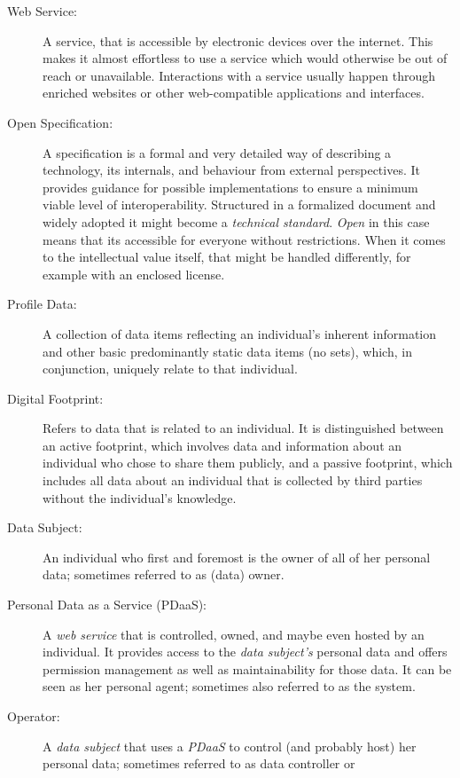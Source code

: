 \documentclass[12pt,english,a4paper,titlepage,cleardoublepage=empty,dottedtoc]{report}
\begin{document}
\begin{description}
\item[Web Service:]
A service, that is accessible by electronic devices over the internet.
This makes it almost effortless to use a service which would otherwise
be out of reach or unavailable. Interactions with a service usually
happen through enriched websites or other web-compatible applications
and interfaces.
\item[Open Specification:]
A specification is a formal and very detailed way of describing a
technology, its internals, and behaviour from external perspectives. It
provides guidance for possible implementations to ensure a minimum
viable level of interoperability. Structured in a formalized document
and widely adopted it might become a \emph{technical standard}.
\emph{Open} in this case means that its accessible for everyone without
restrictions. When it comes to the intellectual value itself, that might
be handled differently, for example with an enclosed license.
\item[\protect\hypertarget{terminologies--profile-data}{}{Profile
Data}:]
A collection of data items reflecting an individual's inherent
information and other basic predominantly static data items (no sets),
which, in conjunction, uniquely relate to that individual.
\item[\protect\hypertarget{terminologies--digital-footprint}{}{Digital
Footprint}:]
Refers to data that is related to an individual. It is distinguished
between an active footprint, which involves data and information about
an individual who chose to share them publicly, and a passive footprint,
which includes all data about an individual that is collected by third
parties without the individual's knowledge.
\item[Data Subject:]
An individual who first and foremost is the owner of all of her personal
data; sometimes referred to as (data) owner.
\item[Personal Data as a Service (PDaaS):]
A \emph{web service} that is controlled, owned, and maybe even hosted by
an individual. It provides access to the \emph{data subject's} personal
data and offers permission management as well as maintainability for
those data. It can be seen as her personal agent; sometimes also
referred to as the system.
\item[\protect\hypertarget{terminologies--operator}{}{Operator}:]
A \emph{data subject} that uses a \emph{PDaaS} to control (and probably
host) her personal data; sometimes referred to as data controller or

\end{description}
\end{document}
